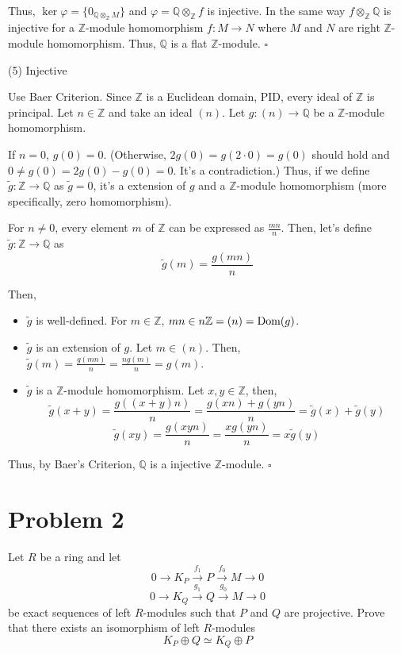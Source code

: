 \documentclass{article}
\newcommand{\qedsq}{\hfill$\square$}
\newcommand{\bbQ}{\mathbb{Q}}
\newcommand{\bbZ}{\mathbb{Z}}
\newcommand{\Dom}{\textnormal{Dom}}
\begin{document}
Thus, \(\ker \varphi = \{0_{\bbQ \otimes_\bbZ M}\}\) and \(\varphi = \bbQ \otimes_\bbZ f\) is injective. In the same way \(f \otimes_\bbZ \bbQ\) is injective for a \(\bbZ\)-module homomorphism \(f: M \to N\) where \(M\) and \(N\) are right \(\bbZ\)-module homomorphism. Thus, \(\bbQ\) is a flat \(\bbZ\)-module.
\qedsq
\newline

\noindent
(5) Injective

Use Baer Criterion.
Since \(\bbZ\) is a Euclidean domain, PID, every ideal of \(\bbZ\) is principal.
Let \(n \in \bbZ\) and take an ideal \((n)\).
Let \(g: (n) \to \bbQ\) be a \(\bbZ\)-module homomorphism.

If \(n = 0\), \(g(0) = 0\).
(Otherwise, \(2g(0) = g(2 \cdot 0) = g(0)\) should hold and \(0 \neq g(0) = 2g(0) - g(0) = 0\). It's a contradiction.)
Thus, if we define \(\tilde{g}: \bbZ \to \bbQ\) as \(\tilde{g} = 0\), it's a extension of \(g\) and a \(\bbZ\)-module homomorphism (more specifically, zero homomorphism).

For \(n \neq 0\), every element \(m\) of \(\bbZ\) can be expressed as \(\frac{mn}{n}\). Then, let's define \(\tilde{g}: \bbZ \to \bbQ\) as
\[\tilde{g}(m) = \frac{g(mn)}{n}\]

Then,
\begin{itemize}
\item \(\tilde g\) is well-defined.
  For \(m \in \bbZ\), \(mn \in n\bbZ = (n) = \Dom(g)\).
\item \(\tilde g\) is an extension of \(g\).
  Let \(m \in (n)\).
  Then, \(\tilde{g}(m) = \frac{g(mn)}{n} = \frac{ng(m)}{n} = g(m)\).
\item \(\tilde g\) is a \(\bbZ\)-module homomorphism.
  Let \(x, y \in \bbZ\), then,
  \[\tilde{g}(x + y) = \frac{g((x + y)n)}{n} = \frac{g(xn) + g(yn)}{n} = \tilde{g}(x) + \tilde{g}(y)\]
  \[\tilde{g}(xy) = \frac{g(xyn)}{n} = \frac{xg(yn)}{n} = x \tilde{g}(y)\]
\end{itemize}

Thus, by Baer's Criterion, \(\bbQ\) is a injective \(\bbZ\)-module.
\qedsq

\newpage
\section*{Problem 2}

Let \(R\) be a ring
and let
\[0 \rightarrow K_P \xrightarrow{f_1} P \xrightarrow{f_0} M \rightarrow 0\]
\[0 \rightarrow K_Q \xrightarrow{g_1} Q \xrightarrow{g_0} M \rightarrow 0\]
be exact sequences of left \(R\)-modules such that \(P\) and \(Q\) are projective.
Prove that there exists an isomorphism of left \(R\)-modules
\[K_P \oplus Q \simeq K_Q \oplus P\]
\end{document}
